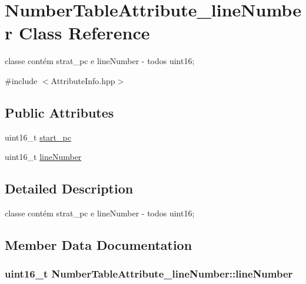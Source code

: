 \hypertarget{class_number_table_attribute__line_number}{}\section{Number\+Table\+Attribute\+\_\+line\+Number Class Reference}
\label{class_number_table_attribute__line_number}


classe contém strat\+\_\+pc e line\+Number -\/ todos uint16;  




{\ttfamily \#include $<$Attribute\+Info.\+hpp$>$}

\subsection*{Public Attributes}
\begin{DoxyCompactItemize}
\item 
uint16\+\_\+t \hyperlink{class_number_table_attribute__line_number_a2ede9887ca805349c8edc876dbc4d0da}{start\+\_\+pc}
\item 
uint16\+\_\+t \hyperlink{class_number_table_attribute__line_number_a25365848043a067fce30ee31cbfe318e}{line\+Number}
\end{DoxyCompactItemize}


\subsection{Detailed Description}
classe contém strat\+\_\+pc e line\+Number -\/ todos uint16; 

\subsection{Member Data Documentation}
\subsubsection[{\texorpdfstring{line\+Number}{lineNumber}}]{\setlength{\rightskip}{0pt plus 5cm}uint16\+\_\+t Number\+Table\+Attribute\+\_\+line\+Number\+::line\+Number}\hypertarget{class_number_table_attribute__line_number_a25365848043a067fce30ee31cbfe318e}{}\label{class_number_table_attribute__line_number_a25365848043a067fce30ee31cbfe318e}
